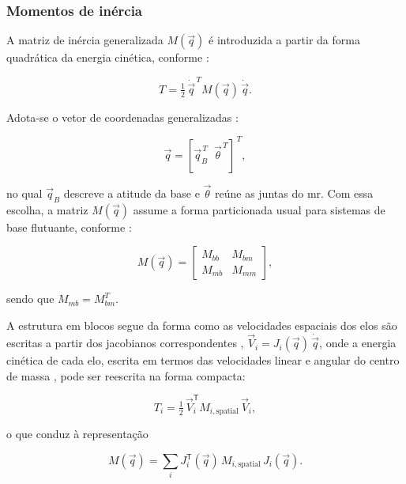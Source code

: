 \subsubsection{Momentos de inércia}
\label{sec:dinAcoplada_momentos_inercia}

A matriz de inércia generalizada $M(\vec q)$ é introduzida a partir da forma quadrática da energia cinética, conforme \cite{spong2006robot}:

\begin{equation}
T = \tfrac{1}{2}\,\dot{\vec q}^{\,T} M(\vec q)\,\dot{\vec q}.
\end{equation}

Adota-se o vetor de coordenadas generalizadas \cite{bloesch2013}:

\begin{equation}
\vec q = [\vec q_B^{\,T}\;\;\vec\theta^{\,T}]^{\,T},
\end{equation}

no qual $\vec q_B$ descreve a atitude da base e $\vec\theta$ reúne as juntas do \gls{mr}.
Com essa escolha, a matriz $M(\vec q)$ assume a forma particionada usual para sistemas de base flutuante, conforme \cite{featherstone2008}:

\begin{equation}
M(\vec q) =
\begin{bmatrix}
M_{bb} & M_{bm} \\[4pt]
M_{mb} & M_{mm}
\end{bmatrix},
\label{eq:M_blocos}
\end{equation}

sendo que $M_{mb}=M_{bm}^{T}$.

A estrutura em blocos segue da forma como as velocidades espaciais dos elos são escritas a partir dos jacobianos correspondentes \cite{featherstone2008}, $\vec V_i = J_i(\vec q)\,\dot{\vec q}$, onde a energia cinética de cada elo, escrita em termos das velocidades linear e angular do centro de massa \cite{sciavicco_siciliano2010}, pode ser reescrita na forma compacta:


\begin{equation}
T_i
=
\tfrac{1}{2}\,
\vec V_i^{\mathsf T} M_{i,\text{spatial}}\,\vec V_i,
\end{equation}

o que conduz à representação

\begin{equation}
M(\vec q)
=
\sum_i
J_i^{\mathsf T}(\vec q)\,
M_{i,\text{spatial}}\,
J_i(\vec q).
\end{equation}

